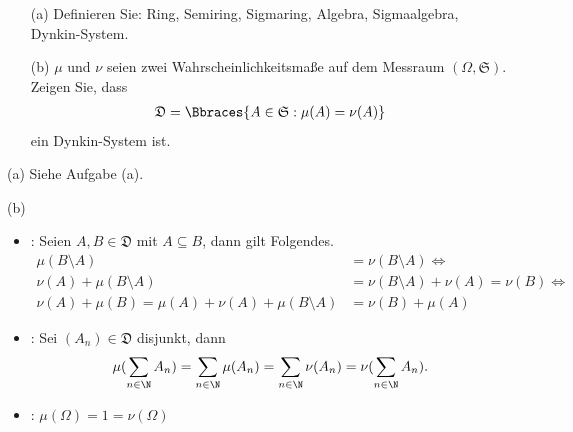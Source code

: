 \begin{exercise}

\begin{itemize}
  \item[(a)] Definieren Sie: Ring, Semiring, Sigmaring, Algebra, Sigmaalgebra, Dynkin-System.
  \item[(b)] $\mu$ und $\nu$ seien zwei Wahrscheinlichkeitsmaße auf dem Messraum $(\Omega, \mathfrak{S})$. Zeigen Sie, dass
  \begin{align*}
    \mathfrak{D} = \Bbraces{A \in \mathfrak{S} : \mu(A) = \nu(A)}
  \end{align*}
  ein Dynkin-System ist.
\end{itemize}

\end{exercise}


\begin{solution}

(a) Siehe Aufgabe (a).

(b)

\begin{itemize}

  \item {}: Seien $A, B \in \mathfrak{D}$ mit $A \subseteq B$, dann gilt Folgendes.
  \begin{align*}
    \mu(B \setminus A)
    & =
    \nu(B \setminus A)
    \Leftrightarrow \\
    \nu(A) + \mu(B \setminus A)
    & =
    \nu(B \setminus A) + \nu(A)
    =
    \nu(B)
    \Leftrightarrow \\
    \nu(A) + \mu(B)
    =
    \mu(A) + \nu(A) + \mu(B \setminus A)
    & =
    \nu(B) + \mu(A)
  \end{align*}

  \item {}: Sei $(A_n) \in \mathfrak{D}$ disjunkt, dann
  \begin{align*}
    \mu(\sum_{n \in \N} A_n)
    =
    \sum_{n \in \N} \mu(A_n)
    =
    \sum_{n \in \N} \nu(A_n)
    =
    \nu(\sum_{n \in \N} A_n).
  \end{align*}

  \item {}: $\mu(\Omega) = 1 = \nu(\Omega)$

\end{itemize}

\end{solution}
